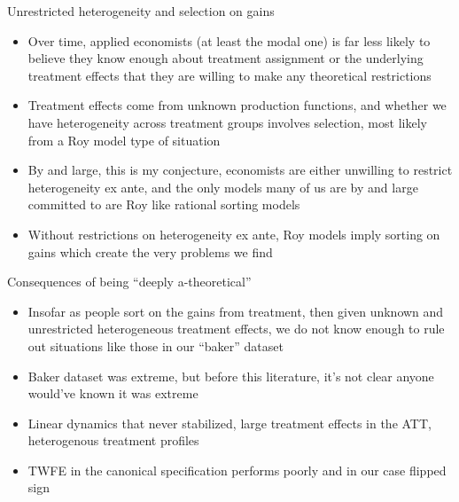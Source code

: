 \documentclass{beamer}
\begin{document}
\begin{frame}{Unrestricted heterogeneity and selection on gains}

\begin{itemize}
\item Over time, applied economists (at least the modal one) is far less likely to believe they know enough about treatment assignment or the underlying treatment effects that they are willing to make any theoretical restrictions
\item Treatment effects come from unknown production functions, and whether we have heterogeneity across treatment groups involves selection, most likely from a Roy model type of situation
\item By and large, this is my conjecture, economists are either unwilling to restrict heterogeneity ex ante, and the only models many of us are by and large committed to are Roy like rational sorting models
\item Without restrictions on heterogeneity ex ante, Roy models imply sorting on gains which create the very problems we find 
\end{itemize}

\end{frame}


\begin{frame}{Consequences of being ``deeply a-theoretical''}

\begin{itemize}
\item Insofar as people sort on the gains from treatment, then given unknown and unrestricted heterogeneous treatment effects, we do not know enough to rule out situations like those in our ``baker'' dataset
\item Baker dataset was extreme, but before this literature, it's not clear anyone would've known it was extreme
\item Linear dynamics that never stabilized, large treatment effects in the ATT, heterogenous treatment profiles
\item TWFE in the canonical specification performs poorly and in our case flipped sign
\end{itemize}

\end{frame}
\end{document}
